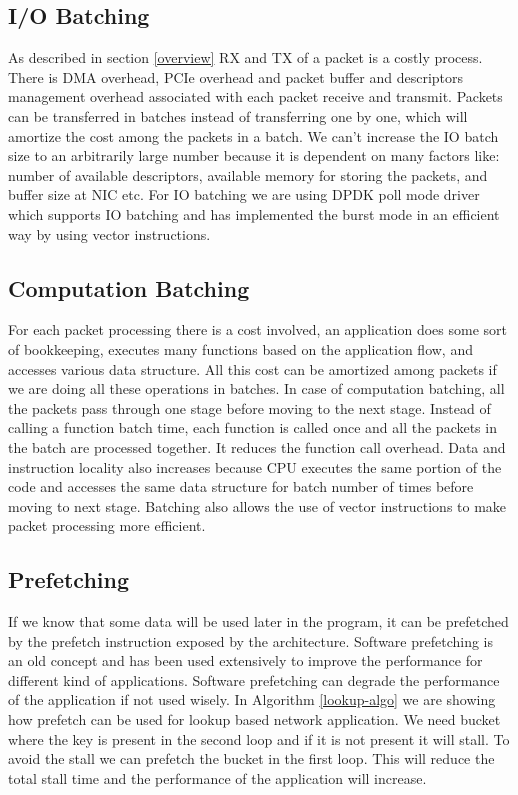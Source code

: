 \subsection{I/O Batching}
\label{iobatching}
As described in section \ref{overview} RX and TX of a packet is a costly process. There is DMA overhead, PCIe overhead and packet buffer and descriptors management overhead associated with each packet receive and transmit. Packets can be transferred in batches instead of transferring one by one, which will amortize the cost among the packets in a batch. We can't increase the IO batch size to an arbitrarily large number because it is dependent on many factors like: number of available descriptors, available memory for storing the packets, and buffer size at NIC etc. For IO batching we are using DPDK poll mode driver which supports IO batching and has implemented the burst mode in an efficient way by using vector instructions.

\subsection{Computation Batching}
\label{computationbatching}
For each packet processing there is a cost involved, an application does some sort of bookkeeping, executes many functions based on the application flow, and accesses various data structure. All this cost can be amortized among packets if we are doing all these operations in batches. In case of computation batching, all the packets pass through one stage before moving to the next stage. Instead of calling a function batch time, each function is called once and all the packets in the batch are processed together. It reduces the function call overhead. Data and instruction locality also increases because CPU executes the same portion of the code and accesses the same data structure for batch number of times before moving to next stage. Batching also allows the use of vector instructions to make packet processing more efficient.

\subsection{Prefetching}
\label{prefetching}
If we know that some data will be used later in the program, it can be prefetched by the prefetch instruction exposed by the architecture. Software prefetching is an old concept and has been used extensively to improve the performance for different kind of applications. Software prefetching can degrade the performance of the application if not used wisely. In Algorithm \ref{lookup-algo} we are showing how prefetch can be used for lookup based network application. We need bucket where the key is present in the second loop and if it is not present it will stall. To avoid the stall we can prefetch the bucket in the first loop. This will reduce the total stall time and the performance of the application will increase.

